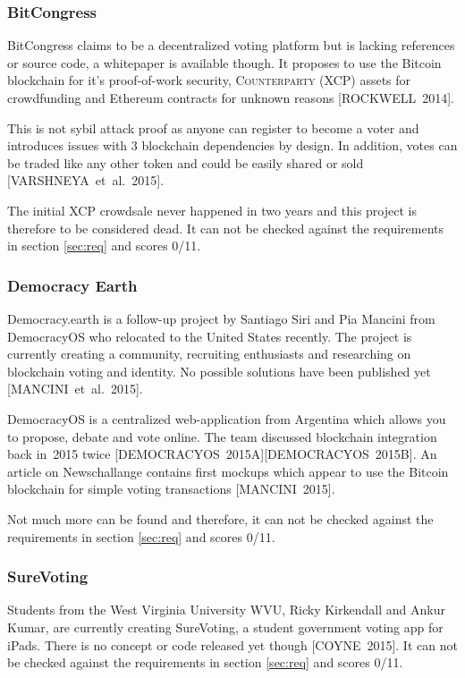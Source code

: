 \documentclass[9pt,oneside]{amsart}
\begin{document}
\begin{multicols}{2}
\subsubsection{BitCongress}
BitCongress claims to be a decentralized voting platform but is lacking references or source code, a whitepaper is available though. It proposes to use the Bitcoin blockchain for it's proof-of-work security, \textsc{Counterparty (XCP)} assets for crowdfunding and Ethereum contracts for unknown reasons [ROCKWELL~2014].\par
This is not sybil attack proof as anyone can register to become a voter and introduces issues with 3 blockchain dependencies by design. In addition, votes can be traded like any other token and could be easily shared or sold [VARSHNEYA~et~al.~2015].\par
The initial XCP crowdsale never happened in two years and this project is therefore to be considered dead. It can not be checked against the requirements in section \ref{sec:req} and scores 0/11.

\subsubsection{Democracy Earth}
Democracy.earth is a follow-up project by Santiago Siri and Pia Mancini from DemocracyOS who relocated to the United States recently. The project is currently creating a community, recruiting enthusiasts and researching on blockchain voting and identity. No possible solutions have been published yet [MANCINI~et~al.~2015].\par
DemocracyOS is a centralized web-application from Argentina which allows you to propose, debate and vote online. The team discussed blockchain integration back in~2015 twice [DEMOCRACYOS~2015A][DEMOCRACYOS~2015B]. An article on Newschallange contains first mockups which appear to use the Bitcoin blockchain for simple voting transactions [MANCINI~2015].\par
Not much more can be found and therefore, it can not be checked against the requirements in section \ref{sec:req} and scores 0/11.

\subsubsection{SureVoting}
Students from the West Virginia University WVU, Ricky Kirkendall and Ankur Kumar, are currently creating SureVoting, a student government voting app for iPads. There is no concept or code released yet though [COYNE~2015]. It can not be checked against the requirements in section \ref{sec:req} and scores 0/11.


\end{multicols}
\end{document}
